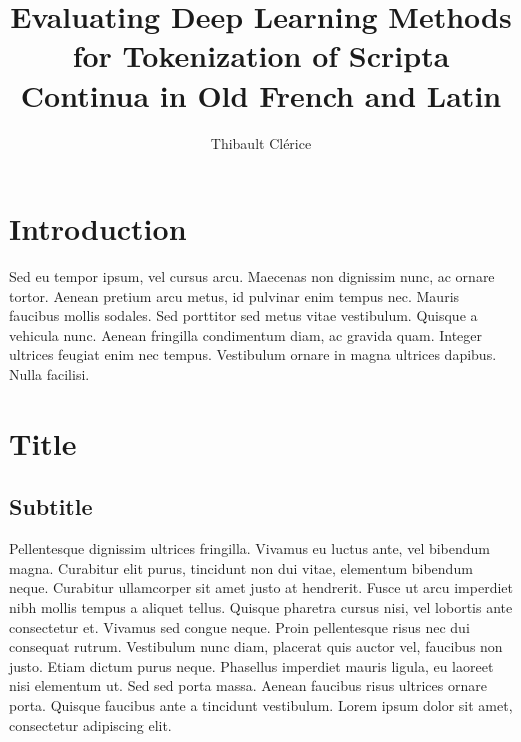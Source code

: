 \documentclass{jdmdh}
\title{Evaluating Deep Learning Methods for Tokenization of Scripta Continua in Old French and Latin}
\author[1]{Thibault Clérice}
\affil[1]{École nationale des Chartes, France}
\affil[2]{Université Lyon 3, France}
\begin{document}
\maketitle



\section{Introduction}

\strut
\vspace{-4ex}

Sed eu tempor ipsum, vel cursus arcu. Maecenas non dignissim nunc, ac ornare tortor. Aenean
pretium arcu metus, id pulvinar enim tempus nec. Mauris faucibus mollis sodales. Sed
porttitor sed metus vitae vestibulum. Quisque a vehicula nunc. Aenean fringilla condimentum
diam, ac gravida quam. Integer ultrices feugiat enim nec tempus. Vestibulum ornare in magna
ultrices dapibus. Nulla facilisi. 

\section{Title}

\subsection{Subtitle}
Pellentesque dignissim ultrices fringilla. Vivamus eu luctus ante, vel bibendum magna.
Curabitur elit purus, tincidunt non dui vitae, elementum bibendum neque. Curabitur
ullamcorper sit amet justo at hendrerit. Fusce ut arcu imperdiet nibh mollis tempus a aliquet
tellus. Quisque pharetra cursus nisi, vel lobortis ante consectetur et. Vivamus sed congue
neque. Proin pellentesque risus nec dui consequat rutrum. Vestibulum nunc diam, placerat
quis auctor vel, faucibus non justo. Etiam dictum purus neque. Phasellus imperdiet mauris
ligula, eu laoreet nisi elementum ut. Sed sed porta massa. Aenean faucibus risus ultrices
ornare porta. Quisque faucibus ante a tincidunt vestibulum. Lorem ipsum dolor sit amet,
consectetur adipiscing elit.
\end{document}

